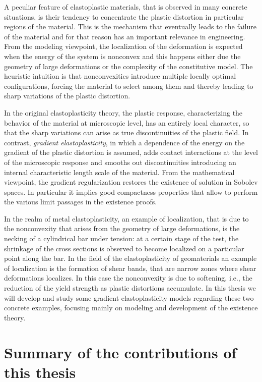 \documentclass[a4paper,10pt,twoside]{amsbook}
\numberwithin{section}{chapter}
\numberwithin{equation}{chapter}
\theoremstyle{definition}
\begin{document}
A peculiar feature of elastoplastic materials, that is observed in many concrete situations, is their tendency to concentrate the plastic distortion in particular regions of the material. This is the mechanism that eventually leads to the failure of the material and for that reason has an important relevance in engineering. From the modeling viewpoint, the localization of the deformation is expected when the energy of the system is nonconvex and this happens either due the geometry of large deformations or the complexity of the constitutive model. The heuristic intuition is that nonconvexities introduce multiple locally optimal configurations, forcing the material to select among them and thereby leading to sharp variations of the plastic distortion.

In the original elastoplasticity theory, the plastic response, characterizing the behavior of the material at microscopic level, has an entirely local character, so that the sharp variations can arise as true discontinuities of the plastic field. In contrast, \emph{gradient elastoplasticity}, in which a dependence of the energy on the gradient of the plastic distortion is assumed, adds contact interactions at the level of the microscopic response and smooths out discontinuities introducing an internal characteristic length scale of the material. From the mathematical viewpoint, the gradient regularization restores the existence of solution in Sobolev spaces. In particular it implies good compactness properties that allow to perform the various limit passages in the existence proofs.

In the realm of metal elastoplasticity, an example of localization, that is due to the nonconvexity that arises from the geometry of large deformations, is the necking of a cylindrical bar under tension: at a certain stage of the test, the shrinkage of the cross sections is observed to become localized on a particular point along the bar. In the field of the elastoplasticity of geomaterials an example of localization is the formation of shear bands, that are narrow zones where shear deformations localizes. In this case the nonconvexity is due to softening, i.e., the reduction of the yield strength as plastic distortions accumulate. In this thesis we will develop and study some gradient elastoplasticity models regarding these two concrete examples, focusing mainly on modeling and development of the existence theory.

\section*{Summary of the contributions of this thesis}
\end{document}
